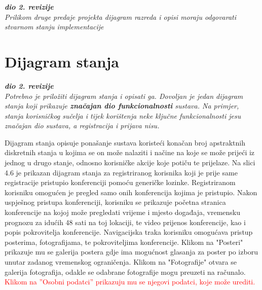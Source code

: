 			\clearpage
			 
			\textbf{\textit{dio 2. revizije}}\\			
			
			\textit{Prilikom druge predaje projekta dijagram razreda i opisi moraju odgovarati stvarnom stanju implementacije}
			
			
			
			\eject
		
		\section{Dijagram stanja}
			
			
			\textbf{\textit{dio 2. revizije}}\\
			
			\textit{Potrebno je priložiti dijagram stanja i opisati ga. Dovoljan je jedan dijagram stanja koji prikazuje \textbf{značajan dio funkcionalnosti} sustava. Na primjer, stanja korisničkog sučelja i tijek korištenja neke ključne funkcionalnosti jesu značajan dio sustava, a registracija i prijava nisu. }
			
			\indent Dijagram stanja opisuje ponašanje sustava koristeći konačan broj apstraktnih diskretnih stanja u kojima se on može nalaziti i načine na koje se može prijeći iz jednog u drugo stanje, odnosno korisničke akcije koje potiču te prijelaze. Na slici 4.6 je prikazan dijagram stanja za registriranog korisnika koji je prije same registracije pristupio konferenciji pomoću generičke lozinke. Registriranom korisniku omogućen je pregled samo onih konferencija kojima je pristupio. Nakon uspješnog pristupa konferenciji, korisniku se prikazuje početna stranica konferencije na kojoj može pregledati vrijeme i mjesto događaja, vremensku prognozu za idućih 48 sati na toj lokaciji, te video prijenos konferencije, kao i popis pokrovitelja konferencije. Navigacijska traka korisniku omogućava pristup posterima, fotografijama, te pokroviteljima konferencije. Klikom na "Posteri" prikazuje mu se galerija postera gdje ima mogućnost glasanja za poster po izboru unutar zadanog vremenskog ograničenja. Klikom na "Fotografije" otvara se galerija fotografija, odakle se odabrane fotografije mogu preuzeti na računalo.
			\textcolor{red}{Klikom na ”Osobni podatci” prikazuju mu se njegovi podatci, koje može urediti.}
			
